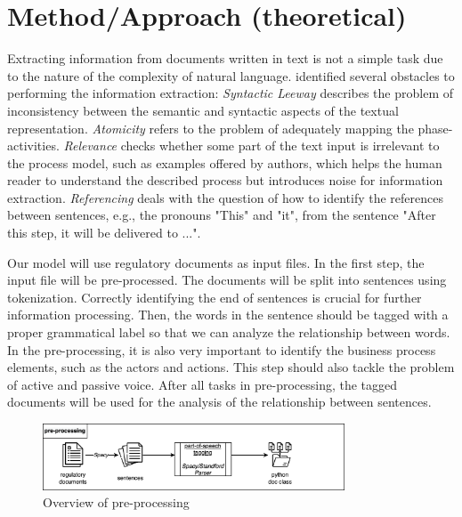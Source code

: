 \chapter{Method/Approach (theoretical)}
Extracting information from documents written in text is not a simple task due to the nature of the complexity of natural language. \cite{t2m_1} identified several obstacles to performing the information extraction: \textit{Syntactic Leeway} describes the problem of inconsistency between the semantic and syntactic aspects of the textual representation. \textit{Atomicity} refers to the problem of adequately mapping the phase-activities. \textit{Relevance} checks whether some part of the text input is irrelevant to the process model, such as examples offered by authors, which helps the human reader to understand the described process but introduces noise for information extraction. \textit{Referencing} deals with the question of how to identify the references between sentences, e.g., the pronouns "This" and "it", from the sentence "After this step, it will be delivered to ...".

Our model will use regulatory documents as input files. In the first step, the input file will be pre-processed. The documents will be split into sentences using tokenization. Correctly identifying the end of sentences is crucial for further information processing. Then, the words in the sentence should be tagged with a proper grammatical label so that we can analyze the relationship between words. In the pre-processing, it is also very important to identify the business process elements, such as the actors and actions. This step should also tackle the problem of active and passive voice. After all tasks in pre-processing, the tagged documents will be used for the analysis of the relationship between sentences.

\begin{figure}[h]
    \centering
    \caption{Overview of pre-processing}
    \includegraphics[width=0.8\textwidth]{tum-resources/images/theoretical_extraction_pre.png}
\end{figure}

